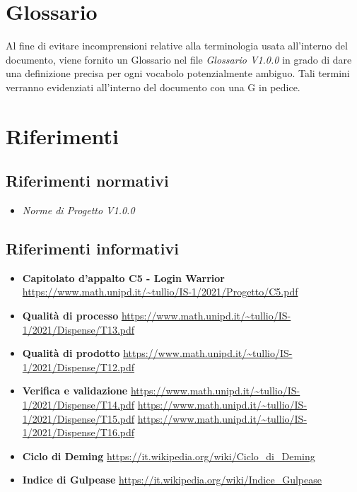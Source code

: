 \section{Glossario}
Al fine di evitare incomprensioni relative alla terminologia usata all'interno del documento, viene fornito un Glossario nel file \textit{Glossario V1.0.0} in grado di dare una definizione precisa per ogni vocabolo potenzialmente ambiguo. Tali termini verranno evidenziati all'interno del documento con una G in pedice.

\section{Riferimenti}
\subsection{Riferimenti normativi}
\begin{itemize}
  \item \textit{Norme di Progetto V1.0.0}
\end{itemize}
\subsection{Riferimenti informativi}
\begin{itemize}
  \item \textbf{Capitolato d'appalto C5 - Login Warrior}
          \url{https://www.math.unipd.it/~tullio/IS-1/2021/Progetto/C5.pdf}
  \item \textbf{Qualità di processo}
          \url{https://www.math.unipd.it/~tullio/IS-1/2021/Dispense/T13.pdf}
  \item \textbf{Qualità di prodotto}
          \url{https://www.math.unipd.it/~tullio/IS-1/2021/Dispense/T12.pdf}
  \item \textbf{Verifica e validazione}
          \url{https://www.math.unipd.it/~tullio/IS-1/2021/Dispense/T14.pdf}
          \url{https://www.math.unipd.it/~tullio/IS-1/2021/Dispense/T15.pdf}
          \url{https://www.math.unipd.it/~tullio/IS-1/2021/Dispense/T16.pdf}
  \item \textbf{Ciclo di Deming}
          \url{https://it.wikipedia.org/wiki/Ciclo_di_Deming}
  \item \textbf{Indice di Gulpease}
          \url{https://it.wikipedia.org/wiki/Indice_Gulpease}
\end{itemize}
